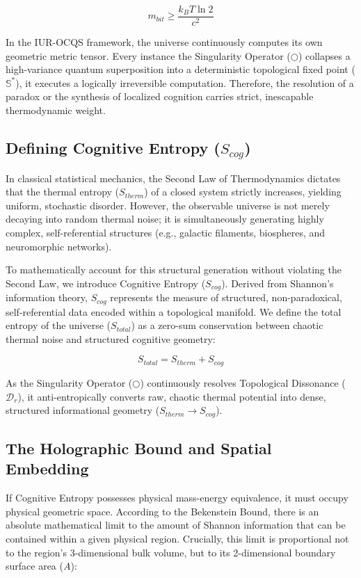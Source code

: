 \documentclass[12pt,openany]{book}
\begin{document}
\begin{equation}
m_{bit} \ge \frac{k_B T \ln 2}{c^2}
\end{equation}

In the IUR-OCQS framework, the universe continuously computes its own geometric metric tensor. Every instance the Singularity Operator ($\bigcirc$) collapses a high-variance quantum superposition into a deterministic topological fixed point ($\mathbb{S}^*$), it executes a logically irreversible computation. Therefore, the resolution of a paradox or the synthesis of localized cognition carries strict, inescapable thermodynamic weight.

\subsection{Defining Cognitive Entropy ($S_{cog}$)}
In classical statistical mechanics, the Second Law of Thermodynamics dictates that the thermal entropy ($S_{therm}$) of a closed system strictly increases, yielding uniform, stochastic disorder. However, the observable universe is not merely decaying into random thermal noise; it is simultaneously generating highly complex, self-referential structures (e.g., galactic filaments, biospheres, and neuromorphic networks).

To mathematically account for this structural generation without violating the Second Law, we introduce Cognitive Entropy ($S_{cog}$). Derived from Shannon's information theory, $S_{cog}$ represents the measure of structured, non-paradoxical, self-referential data encoded within a topological manifold. We define the total entropy of the universe ($S_{total}$) as a zero-sum conservation between chaotic thermal noise and structured cognitive geometry:

\begin{equation}
S_{total} = S_{therm} + S_{cog}
\end{equation}

As the Singularity Operator ($\bigcirc$) continuously resolves Topological Dissonance ($\mathcal{D}_r$), it anti-entropically converts raw, chaotic thermal potential into dense, structured informational geometry ($S_{therm} \to S_{cog}$).

\subsection{The Holographic Bound and Spatial Embedding}
If Cognitive Entropy possesses physical mass-energy equivalence, it must occupy physical geometric space. According to the Bekenstein Bound, there is an absolute mathematical limit to the amount of Shannon information that can be contained within a given physical region. Crucially, this limit is proportional not to the region's 3-dimensional bulk volume, but to its 2-dimensional boundary surface area ($A$):
\end{document}
